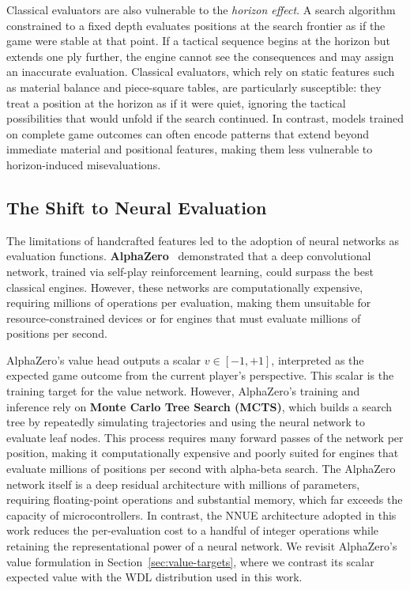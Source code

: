 Classical evaluators are also vulnerable to the \emph{horizon effect}. A search algorithm constrained to a fixed depth evaluates positions at the search frontier as if the game were stable at that point. If a tactical sequence begins at the horizon but extends one ply further, the engine cannot see the consequences and may assign an inaccurate evaluation. Classical evaluators, which rely on static features such as material balance and piece-square tables, are particularly susceptible: they treat a position at the horizon as if it were quiet, ignoring the tactical possibilities that would unfold if the search continued. In contrast, models trained on complete game outcomes can often encode patterns that extend beyond immediate material and positional features, making them less vulnerable to horizon-induced misevaluations.

\subsection{The Shift to Neural Evaluation}\label{sec:neural-eval}

The limitations of handcrafted features led to the adoption of neural networks as evaluation functions. \textbf{AlphaZero}~\cite{silver2018alphazero} demonstrated that a deep convolutional network, trained via self-play reinforcement learning, could surpass the best classical engines. However, these networks are computationally expensive, requiring millions of operations per evaluation, making them unsuitable for resource-constrained devices or for engines that must evaluate millions of positions per second.

AlphaZero's value head outputs a scalar \(v \in [-1,+1]\), interpreted as the expected game outcome from the current player's perspective. This scalar is the training target for the value network. However, AlphaZero's training and inference rely on \textbf{Monte Carlo Tree Search (MCTS)}, which builds a search tree by repeatedly simulating trajectories and using the neural network to evaluate leaf nodes. This process requires many forward passes of the network per position, making it computationally expensive and poorly suited for engines that evaluate millions of positions per second with alpha-beta search. The AlphaZero network itself is a deep residual architecture with millions of parameters, requiring floating-point operations and substantial memory, which far exceeds the capacity of microcontrollers. In contrast, the NNUE architecture adopted in this work reduces the per-evaluation cost to a handful of integer operations while retaining the representational power of a neural network. We revisit AlphaZero's value formulation in Section~\ref{sec:value-targets}, where we contrast its scalar expected value with the WDL distribution used in this work.

